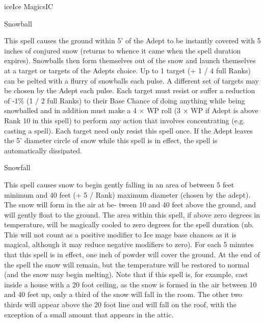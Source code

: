 \begin{College}[1.5]{ice}{Ice Magics}{IC}
\begin{spell}[S-13]{Snowball}
\begin{effects}
This spell causes the ground within 5’ of the Adept to be instantly
covered with 5 inches of conjured snow (returns to whence it came when
the spell duration expires). Snowballs then form themselves out of the
snow and launch themselves at a target or targets of the Adepts
choice.  Up to 1 target (+ 1 / 4 full Ranks) can be pelted with a
flurry of snowballs each pulse.  A different set of targets may be
chosen by the Adept each pulse.  Each target must resist or suffer a
reduction of -1\% (1 / 2 full Ranks) to their Base Chance of doing
anything while being snowballed and in addition must make a 4 × WP
roll (3 × WP if Adept is above Rank 10 in this spell) to perform any
action that involves concentrating (e.g.  casting a spell).  Each
target need only resist this spell once.  If the Adept leaves the 5’
diameter circle of snow while this spell is in effect, the spell is
automatically dissipated.
\end{effects}
\end{spell}

\begin{spell}[S-14]{Snowfall}
\begin{effects}
This spell causes snow to begin gently falling in an area of between 5
feet minimum and 40 feet (+ 5 / Rank) maximum diameter (chosen by the
adept).  The snow will form in the air at be- tween 10 and 40 feet
above the ground, and will gently float to the ground.  The area
within this spell, if above zero degrees in temperature, will be
magically cooled to zero degrees for the spell duration (nb.  This
will not count as a positive modifier to Ice mage base chances as it
is magical, although it may reduce negative modifiers to zero).  For
each 5 minutes that this spell is in effect, one inch of powder will
cover the ground. At the end of the spell the snow will remain, but
the temperature will be restored to normal (and the snow may begin
melting).  Note that if this spell is, for example, cast inside a
house with a 20 foot ceiling, as the snow is formed in the air between
10 and 40 feet up, only a third of the snow will fall in the room.
The other two thirds will appear above the 20 foot line and will fall
on the roof, with the exception of a small amount that appears in the
attic.
\end{effects}
\end{spell}


\end{College}
